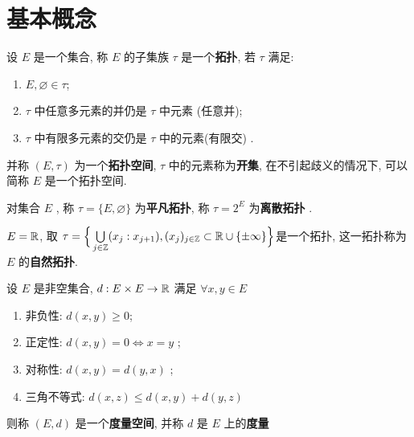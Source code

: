 \section{基本概念}

    \begin{Definition}[拓扑空间]\label{def:拓扑空间}
       设 $ E $ 是一个集合, 称 $ E $ 的子集族 $ \tau $ 是一个\textbf{拓扑}, 若 $ \tau $ 满足:
       \begin{enumerate}[($ \mathrm{O}_1 $), itemindent=2.5\parindent]
          \item $ E, \varnothing\in \tau $;
          \item\label{item:O2} $ \tau $ 中任意多元素的并仍是 $ \tau $ 中元素 (任意并);
          \item\label{item:O3} $ \tau $ 中有限多元素的交仍是 $ \tau $ 中的元素(有限交) .
       \end{enumerate}
       并称 $ (E, \tau) $ 为一个\textbf{拓扑空间}, $ \tau $ 中的元素称为\textbf{开集}, 在不引起歧义的情况下, 可以简称 $ E $ 是一个拓扑空间.
    \end{Definition}

    \begin{Remark}\label{rmk:平凡离散}
       对集合 $ E $ , 称 $ \tau=\{ E, \varnothing \} $ 为\textbf{平凡拓扑}, 称 $ \tau=2^{E} $ 为\textbf{离散拓扑} .
    \end{Remark}

    \begin{Example}
       $ E=\mathbb{R} $, 取 $ \tau=\Big\{ \bigcup\limits_{j\in\mathbb{Z}}(x_{j}: x_{j+1}), (x_{j})_{j\in\mathbb{Z}}\subset \mathbb{R}\cup\{ \pm\infty \} \Big\} $是一个拓扑, 这一拓扑称为 $ E $ 的\textbf{自然拓扑}.
    \end{Example}

    \begin{Definition}[度量空间]\label{def:度量空间}
       设 $ E $ 是非空集合, $ d: E\times E\to \mathbb{R} $ 满足 $ \forall x, y\in E $
       \begin{enumerate}[(1)]
          \item 非负性: $ d(x, y)\geqslant 0 $;
          \item 正定性: $ d(x, y)=0\Longleftrightarrow x=y $ ;
          \item 对称性: $ d(x, y)=d(y, x) $ ;
          \item 三角不等式: $ d(x, z)\leqslant d(x, y)+d(y, z) $
       \end{enumerate}
       则称 $ (E, d) $ 是一个\textbf{度量空间}, 并称 $ d $ 是 $ E $ 上的\textbf{度量}
    \end{Definition}

